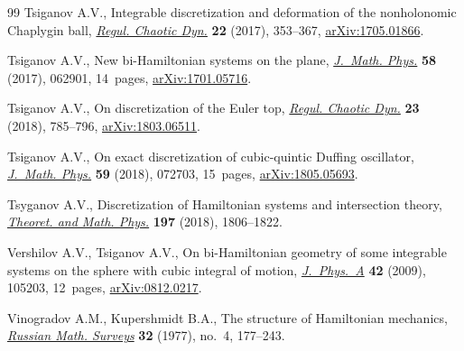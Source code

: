 \documentclass[10pt,a4paper]{amsart}
\numberwithin{equation}{section}
\begin{document}
\begin{thebibliography}{99}
Tsiganov A.V., Integrable discretization and deformation of the nonholonomic
  {C}haplygin ball, \href{https://doi.org/10.1134/S1560354717040025}{\textit{Regul. Chaotic Dyn.}} \textbf{22} (2017), 353--367,
  \href{https://arxiv.org/abs/1705.01866}{arXiv:1705.01866}.

Tsiganov A.V., New bi-{H}amiltonian systems on the plane, \href{https://doi.org/10.1063/1.4989534}{\textit{J.~Math.
  Phys.}} \textbf{58} (2017), 062901, 14~pages, \href{https://arxiv.org/abs/1701.05716}{arXiv:1701.05716}.

Tsiganov A.V., On discretization of the {E}uler top, \href{https://doi.org/10.1134/S1560354718060114}{\textit{Regul. Chaotic
  Dyn.}} \textbf{23} (2018), 785--796, \href{https://arxiv.org/abs/1803.06511}{arXiv:1803.06511}.

Tsiganov A.V., On exact discretization of cubic-quintic {D}uffing oscillator,
  \href{https://doi.org/10.1063/1.5034381}{\textit{J.~Math. Phys.}} \textbf{59} (2018), 072703, 15~pages,
  \href{https://arxiv.org/abs/1805.05693}{arXiv:1805.05693}.

Tsyganov A.V., Discretization of Hamiltonian systems and intersection theory,
  \href{https://doi.org/10.1134/S0040577918120103}{\textit{Theoret. and Math. Phys.}} \textbf{197} (2018), 1806--1822.

Vershilov A.V., Tsiganov A.V., On bi-{H}amiltonian geometry of some integrable
  systems on the sphere with cubic integral of motion, \href{https://doi.org/10.1088/1751-8113/42/10/105203}{\textit{J.~Phys.~A}}
  \textbf{42} (2009), 105203, 12~pages, \href{https://arxiv.org/abs/0812.0217}{arXiv:0812.0217}.

Vinogradov A.M., Kupershmidt B.A., The structure of {H}amiltonian mechanics,
  \href{https://doi.org/10.1070/RM1977v032n04ABEH001642}{\textit{Russian Math. Surveys}} \textbf{32} (1977), no.~4, 177--243.

\end{thebibliography}
\end{document}
